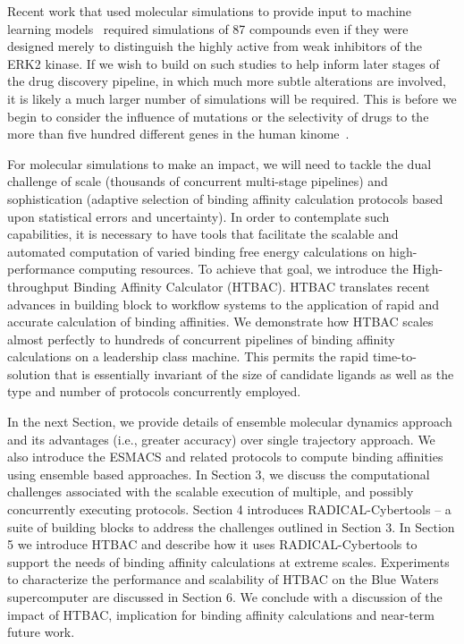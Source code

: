Recent work that used molecular simulations to provide input to machine
learning models~\cite{Ash2017} required simulations of 87 compounds even if
they were designed merely to distinguish the highly active from weak
inhibitors of the ERK2 kinase. If we wish to build on such studies to help
inform later stages of the drug discovery pipeline, in which much more subtle
alterations are involved, it is likely a much larger number of simulations
will be required. This is before we begin to consider the influence of
mutations or the selectivity of drugs to the more than five hundred different
genes in the human kinome~\cite{Li2016}.

For molecular simulations to make an impact, we will need to tackle the dual
challenge of scale (thousands of concurrent multi-stage pipelines) and
sophistication (adaptive selection of binding affinity calculation protocols
based upon statistical errors and uncertainty). In order to contemplate such
capabilities, it is necessary to have tools that facilitate the scalable and
automated computation of varied binding free energy calculations on high-
performance computing resources. To achieve that goal, we introduce the High-
throughput Binding Affinity Calculator (HTBAC). HTBAC translates recent
advances in building block to workflow systems to the application of rapid and
accurate calculation of  binding affinities. We demonstrate how HTBAC scales
almost perfectly to hundreds of concurrent pipelines of binding affinity
calculations on a leadership class machine. This permits the rapid time-to-
solution that is essentially invariant of the size of candidate ligands as
well as the type and number of protocols concurrently employed.

In the next Section, we provide details of ensemble molecular dynamics
approach and its advantages (i.e., greater accuracy) over single trajectory
approach. We also introduce the ESMACS and related protocols to compute
binding affinities using ensemble based approaches. In Section 3, we discuss
the computational challenges associated with the scalable execution of
multiple, and possibly concurrently executing protocols. Section 4 introduces
RADICAL-Cybertools -- a suite of building blocks to address the challenges
outlined in Section 3. In Section 5 we introduce HTBAC and describe how it
uses RADICAL-Cybertools to support the needs of binding affinity calculations
at extreme scales. Experiments to characterize the performance and scalability
of HTBAC on the Blue Waters supercomputer are discussed in Section 6. We
conclude with a discussion of the impact of HTBAC, implication for binding
affinity calculations and near-term future work.

